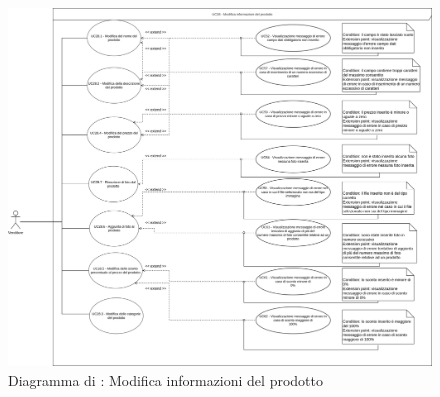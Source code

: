 
\label{modifica-prodotto}

\begin{figure}[H]
    \centering
    \includegraphics[width=\textwidth]{Immagini/DiagrammiUC/Venditore/ModificaProdotto.png}
    \caption{Diagramma di \actualUC: Modifica informazioni del prodotto}
    \label{fig:modifica-prodotto}
\end{figure}

